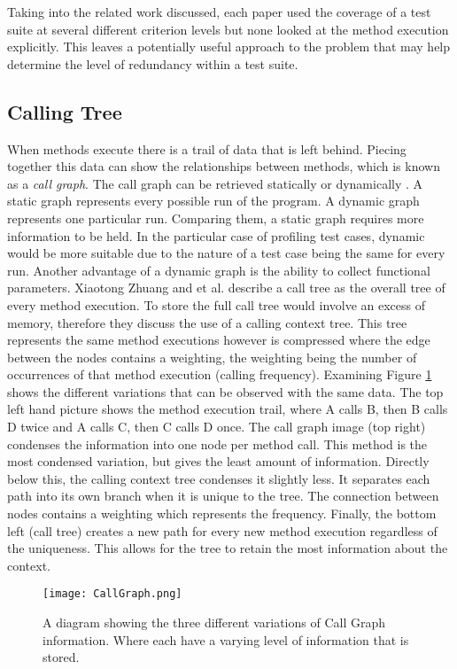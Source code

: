 Taking into the related work discussed, each paper used the coverage of a test suite at several different criterion levels but none looked at the method execution explicitly. This leaves a potentially useful approach to the problem that may help determine the level of redundancy within a test suite. 
\subsection{Calling Tree}
When methods execute there is a trail of data that is left behind. Piecing together this data can show the relationships between methods, which is known as a \textit{call graph}. The call graph can be retrieved statically or dynamically \cite{graham1982gprof}. A static graph represents every possible run of the program. A dynamic graph represents one particular run. Comparing them, a static graph requires more information to be held. In the particular case of profiling test cases, dynamic would be more suitable due to the nature of a test case being the same for every run. Another advantage of a dynamic graph is the ability to collect functional parameters. Xiaotong Zhuang and et al. \cite{Zhuang06accurate} describe a call tree as the overall tree of every method execution. To store the full call tree would involve an excess of memory, therefore they discuss the use of a calling context tree. This tree represents the same method executions however is compressed where the edge between the nodes contains a weighting, the weighting being the number of occurrences of that method execution (calling frequency). Examining Figure \ref{fig:callgraph} shows the different variations that can be observed with the same data. The top left hand picture shows the method execution trail, where A calls B, then B calls D twice and A calls C, then C calls D once. The call graph image (top right) condenses the information into one node per method call. This method is the most condensed variation, but gives the least amount of information. Directly below this, the calling context tree condenses it slightly less. It separates each path into its own branch when it is unique to the tree. The connection between nodes contains a weighting which represents the frequency. Finally, the bottom left (call tree) creates a new path for every new method execution regardless of the uniqueness. This allows for the tree to retain the most information about the context.

\begin{figure}[h]
\begin{center}
\texttt{[image: CallGraph.png]}
\end{center}
\caption{A diagram showing the three different variations of Call Graph information. Where  each have a varying level of information that is stored.}
\label{fig:callgraph}
\end{figure}


